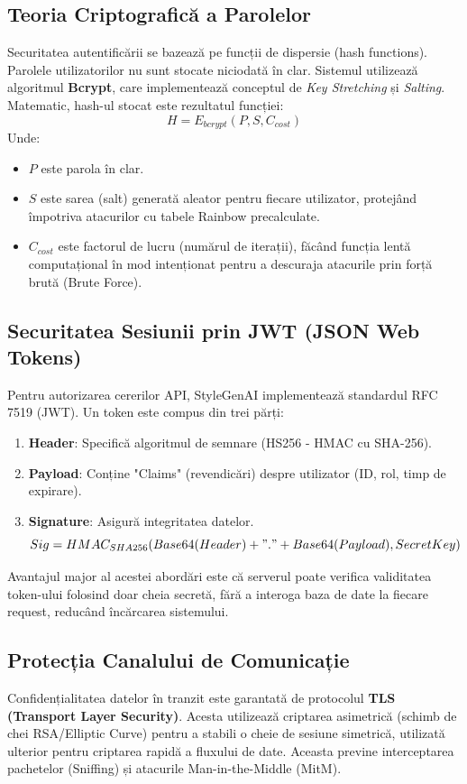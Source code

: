 \subsection{Teoria Criptografică a Parolelor}
Securitatea autentificării se bazează pe funcții de dispersie (hash functions). Parolele utilizatorilor nu sunt stocate niciodată în clar.
Sistemul utilizează algoritmul \textbf{Bcrypt}, care implementează conceptul de \textit{Key Stretching} și \textit{Salting}.
Matematic, hash-ul stocat este rezultatul funcției:
\begin{equation}
H = E_{bcrypt}(P, S, C_{cost})
\end{equation}
Unde:
\begin{itemize}
    \item $P$ este parola în clar.
    \item $S$ este sarea (salt) generată aleator pentru fiecare utilizator, protejând împotriva atacurilor cu tabele Rainbow precalculate.
    \item $C_{cost}$ este factorul de lucru (numărul de iterații), făcând funcția lentă computațional în mod intenționat pentru a descuraja atacurile prin forță brută (Brute Force).
\end{itemize}

\subsection{Securitatea Sesiunii prin JWT (JSON Web Tokens)}
Pentru autorizarea cererilor API, StyleGenAI implementează standardul RFC 7519 (JWT). Un token este compus din trei părți:
\begin{enumerate}
    \item \textbf{Header}: Specifică algoritmul de semnare (HS256 - HMAC cu SHA-256).
    \item \textbf{Payload}: Conține "Claims" (revendicări) despre utilizator (ID, rol, timp de expirare).
    \item \textbf{Signature}: Asigură integritatea datelor.
    \begin{equation}
    Sig = HMAC_{SHA256}(Base64(Header) + "." + Base64(Payload), SecretKey)
    \end{equation}
\end{enumerate}
Avantajul major al acestei abordări este că serverul poate verifica validitatea token-ului folosind doar cheia secretă, fără a interoga baza de date la fiecare request, reducând încărcarea sistemului.

\subsection{Protecția Canalului de Comunicație}
Confidențialitatea datelor în tranzit este garantată de protocolul \textbf{TLS (Transport Layer Security)}. Acesta utilizează criptarea asimetrică (schimb de chei RSA/Elliptic Curve) pentru a stabili o cheie de sesiune simetrică, utilizată ulterior pentru criptarea rapidă a fluxului de date. Aceasta previne interceptarea pachetelor (Sniffing) și atacurile Man-in-the-Middle (MitM).